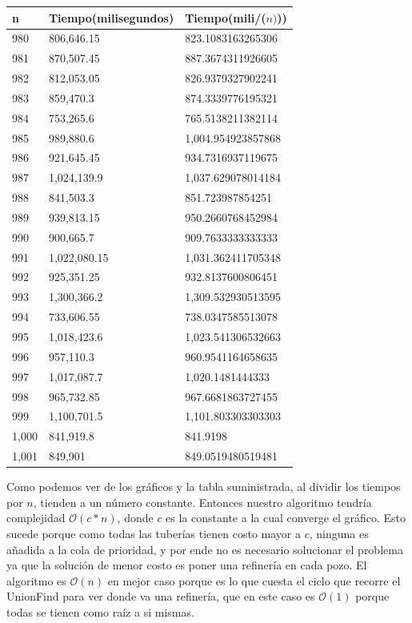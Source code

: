 \begin{table}[H]
\parbox{0.3\textwidth}{
    \begin{tabular}{ | l | l | l |}
    \hline
n   &Tiempo(milisegundos) &Tiempo(mili/($n)$))\\ \hline
980	&806,646.15	&823.1083163265306\\ \hline
981	&870,507.45	&887.3674311926605\\ \hline
982	&812,053.05	&826.9379327902241\\ \hline
983	&859,470.3	&874.3339776195321\\ \hline
984	&753,265.6	&765.5138211382114\\ \hline
985	&989,880.6	&1,004.954923857868\\ \hline
986	&921,645.45	&934.7316937119675\\ \hline
987	&1,024,139.9	&1,037.629078014184\\ \hline
988	&841,503.3	&851.723987854251\\ \hline
989	&939,813.15	&950.2660768452984\\ \hline
990	&900,665.7	&909.7633333333333\\ \hline
991	&1,022,080.15	&1,031.362411705348\\ \hline
992	&925,351.25	&932.8137600806451\\ \hline
993	&1,300,366.2	&1,309.532930513595\\ \hline
994	&733,606.55	&738.0347585513078\\ \hline
995	&1,018,423.6	&1,023.541306532663\\ \hline
996	&957,110.3	&960.9541164658635\\ \hline
997	&1,017,087.7	&1,020.1481444333\\ \hline
998	&965,732.85	&967.6681863727455\\ \hline
999	&1,100,701.5	&1,101.803303303303\\ \hline
1,000	&841,919.8	&841.9198\\ \hline
1,001	&849,901	&849.0519480519481\\ \hline
\end{tabular}
}
\end{table}

Como podemos ver de los gráficos y la tabla suministrada, al dividir los tiempos por $n$, tienden a un número constante. Entonces nuestro algoritmo tendría complejidad $\mathcal{O}(c*n)$, donde $c$ es la constante a la cual converge el gráfico. Esto sucede porque como todas las tuberías tienen costo mayor a $c$, ninguna es añadida a la cola de prioridad, y por ende no es necesario solucionar el problema ya que la solución de menor costo es poner una refinería en cada pozo. El algoritmo es $\mathcal{O}(n)$ en mejor caso porque es lo que cuesta el ciclo que recorre el UnionFind para ver donde va una refinería, que en este caso es $\mathcal{O}(1)$ porque todas se tienen como raíz a si mismas.